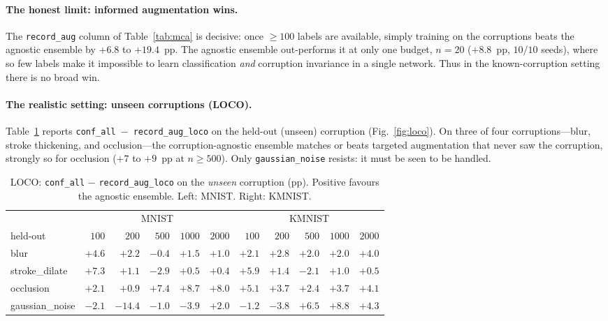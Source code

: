 \documentclass{article}
\begin{document}
\paragraph{The honest limit: informed augmentation wins.}
The \texttt{record\_aug} column of Table~\ref{tab:mca} is decisive: once $\geq\!100$ labels are
available, simply training on the corruptions beats the agnostic ensemble by $+6.8$ to
$+19.4$~pp. The agnostic ensemble out-performs it at only one budget, $n\!=\!20$ ($+8.8$~pp,
$10/10$ seeds), where so few labels make it impossible to learn classification \emph{and}
corruption invariance in a single network. Thus in the known-corruption setting there is no
broad win.

\paragraph{The realistic setting: unseen corruptions (LOCO).}
Table~\ref{tab:loco} reports \texttt{conf\_all}~$-$~\texttt{record\_aug\_loco} on the
held-out (unseen) corruption (Fig.~\ref{fig:loco}). On three of four corruptions---blur,
stroke thickening, and occlusion---the corruption-agnostic ensemble matches or beats targeted
augmentation that never saw the corruption, strongly so for occlusion ($+7$ to $+9$~pp at
$n\!\geq\!500$). Only \texttt{gaussian\_noise} resists: it must be seen to be handled.

\begin{table}[t]
\caption{LOCO: \texttt{conf\_all} $-$ \texttt{record\_aug\_loco} on the \emph{unseen}
         corruption (pp). Positive favours the agnostic ensemble. Left: MNIST. Right: KMNIST.}
\label{tab:loco}
\centering
\small
\begin{tabular}{@{}lrrrrr@{\hskip 1.2em}rrrrr@{}}
\toprule
 & \multicolumn{5}{c}{MNIST} & \multicolumn{5}{c}{KMNIST} \\
\cmidrule(r){2-6}\cmidrule(l){7-11}
held-out & $100$ & $200$ & $500$ & $1000$ & $2000$ & $100$ & $200$ & $500$ & $1000$ & $2000$ \\
\midrule
blur            & $+4.6$ & $+2.2$ & $-0.4$ & $+1.5$ & $+1.0$ & $+2.1$ & $+2.8$ & $+2.0$ & $+2.0$ & $+4.0$ \\
stroke\_dilate  & $+7.3$ & $+1.1$ & $-2.9$ & $+0.5$ & $+0.4$ & $+5.9$ & $+1.4$ & $-2.1$ & $+1.0$ & $+0.5$ \\
occlusion       & $+2.1$ & $+0.9$ & $+7.4$ & $+8.7$ & $+8.0$ & $+5.1$ & $+3.7$ & $+2.4$ & $+3.7$ & $+4.1$ \\
gaussian\_noise & $-2.1$ & $-14.4$& $-1.0$ & $-3.9$ & $+2.0$ & $-1.2$ & $-3.8$ & $+6.5$ & $+8.8$ & $+4.3$ \\
\bottomrule
\end{tabular}
\end{table}
\end{document}

